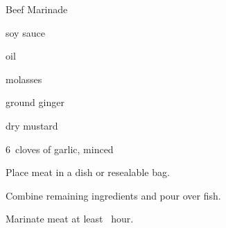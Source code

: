 \begin{recipe}{Beef Marinade}{}{}

\begin{ingredients}
\item {} 
\item \C{\half} soy sauce
\item \C{\quarter} oil
\item {} molasses
\item {} ground ginger
\item {} dry mustard
\item 6~cloves of garlic, minced
\end{ingredients}

\begin{directions}
\item Place meat in a dish or resealable bag.
\item Combine remaining ingredients and pour over fish.
\item Marinate meat at least \half~hour.
\end{directions}

\end{recipe}
